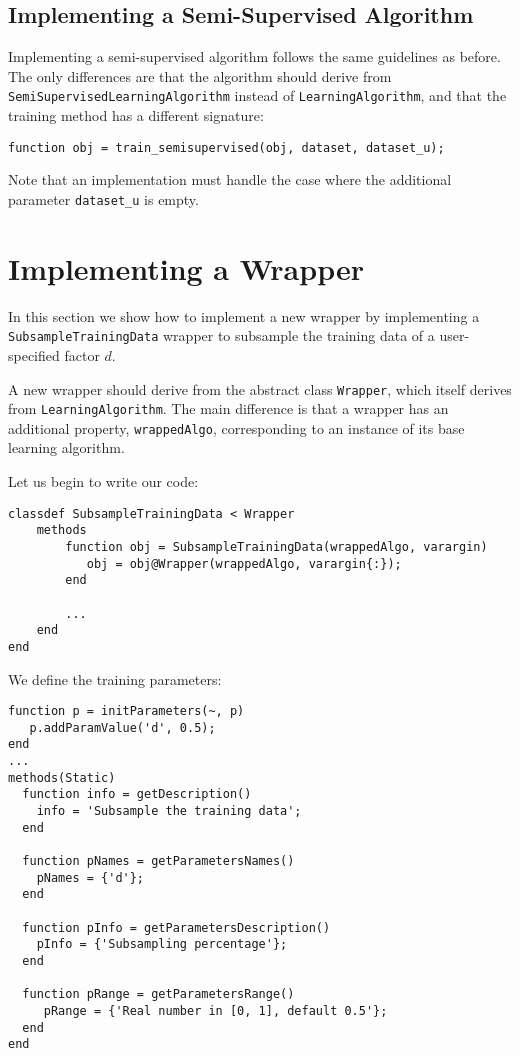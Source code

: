 \subsection{Implementing a Semi-Supervised Algorithm}

Implementing a semi-supervised algorithm follows the same guidelines as before. The only differences are that the algorithm should derive from \verb|SemiSupervisedLearningAlgorithm| instead of \verb|LearningAlgorithm|, and that the training method has a different signature:

\begin{lstlisting}
function obj = train_semisupervised(obj, dataset, dataset_u);
\end{lstlisting}

\noindent Note that an implementation must handle the case where the additional parameter \verb|dataset_u| is empty.

\section{Implementing a Wrapper}

In this section we show how to implement a new wrapper by implementing a \verb|SubsampleTrainingData| wrapper to subsample the training data of a  user-specified factor $d$.

A new wrapper should derive from the abstract class \verb|Wrapper|, which itself derives from \verb|LearningAlgorithm|. The main difference is that a wrapper has an additional property, \verb|wrappedAlgo|, corresponding to an instance of its base learning algorithm.

Let us begin to write our code:


\begin{lstlisting}
classdef SubsampleTrainingData < Wrapper
	methods
		function obj = SubsampleTrainingData(wrappedAlgo, varargin)
		   obj = obj@Wrapper(wrappedAlgo, varargin{:});
		end
		
		...
	end
end
\end{lstlisting}

\noindent We define the training parameters:

\begin{lstlisting}
function p = initParameters(~, p)
   p.addParamValue('d', 0.5);
end
...
methods(Static)
  function info = getDescription()
    info = 'Subsample the training data';
  end
        
  function pNames = getParametersNames()
    pNames = {'d'}; 
  end
        
  function pInfo = getParametersDescription()
    pInfo = {'Subsampling percentage'};
  end
        
  function pRange = getParametersRange()
     pRange = {'Real number in [0, 1], default 0.5'};
  end 
end
\end{lstlisting}

